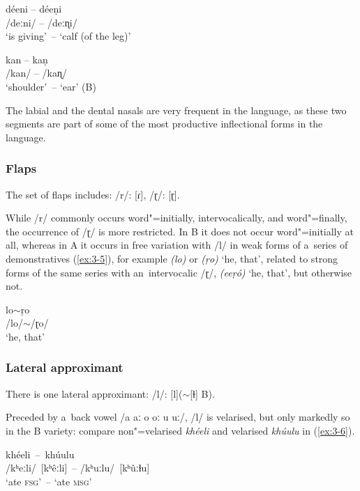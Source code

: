 \begin{exe}
\ex
\label{ex:3-3}
\gll déeni -- déeṇi \\
/deːni/ -- /deːɳi/ \\
\glt `is giving'~-- `calf (of the leg)' 

\ex
\label{ex:3-4}
\gll kan -- kaṇ \\
/kan/ -- /kaɳ/ \\
\glt `shoulder'~-- `ear' (B)
\end{exe}

The labial and the dental nasals are very frequent in the language, as these two segments are part of some of the most productive inflectional forms in the language.

\subsubsection*{Flaps}

The set of flaps includes: /r/: [ɾ], /ɽ/: [ɽ].


While /r/ commonly occurs word"=initially, intervocalically, and word"=finally, the occurrence of /ɽ/
is more restricted. In B it does not occur word"=initially at all, whereas in A it occurs in free
variation with /l/ in weak forms of a~series of demonstratives (\ref{ex:3-5}), for example \textit{(lo)} or
\textit{(ṛo)} `he, that', related to strong forms of the same series with an~intervocalic
/ɽ/, \textit{(eeṛó)} `he, that', but otherwise not.

\begin{exe}
\ex
\label{ex:3-5}
\gll lo$\sim${}ṛo \\
/lo/$\sim${}/ɽo/ \\
\glt `he, that' 
\end{exe}

\subsubsection*{Lateral approximant}

There is one lateral approximant: /l/: [l]($\sim$[ɫ] B).


Preceded by a~back vowel /a aː o oː u uː/, /l/ is velarised, but only markedly so in the B variety: compare non"=velarised \textit{khéeli} and velarised \textit{khúulu} in (\ref{ex:3-6}).

\begin{exe}
\ex
\label{ex:3-6}
\gll khéeli~--~khúulu \\
/kʰeːli/~[kʰêːli]~-- /kʰuːlu/~[kʰûːɫu] \\ 
\glt `ate \textsc{fsg}'~-- `ate \textsc{msg}'
\end{exe}

